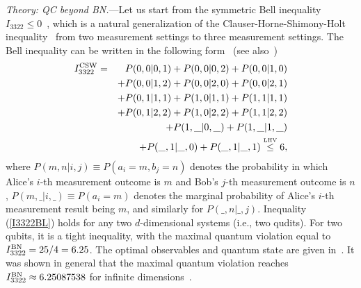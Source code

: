 \documentclass[prl,letterpaper,english,reprint,nofootinbib,aps,superscriptaddress,showpacs,showkeys]{revtex4-1}
\theoremstyle{definition}
\theoremstyle{remark}
\begin{document}

\emph{Theory: QC beyond BN.}---Let us start from the symmetric Bell inequality  $I_{3322}\le 0$~\cite{BG08}, which is a natural generalization of the Clauser-Horne-Shimony-Holt inequality~\cite{CHSH} from two measurement settings to three measurement settings.
The Bell inequality can be written in the following form~\cite{RDLTC14} (see also~\cite{SM})
 \begin{eqnarray}
 I_{3322}^{\rm CSW}
 &=&P(0,0 \vert 0,1) + P(0,0 \vert 0,2) + P(0,0 \vert 1,0) \nonumber\\
 &&+ P(0,0 \vert 1,2) + P(0,0 \vert 2,0) + P(0,0 \vert 2,1) \nonumber \\
 &&+ P(0,1 \vert 1,1) + P(1,0 \vert 1,1) + P(1,1 \vert 1,1) \nonumber\\
 &&+ P(0,1 \vert 2,2) + P(1,0 \vert 2,2) + P(1,1 \vert 2,2) \nonumber \\
 &&+ P(1,\_ \vert 0,\_) +P(1,\_ \vert 1,\_)\nonumber \\
 &&  + P(\_,1 \vert \_,0)+ P(\_,1 \vert \_,1)\stackrel{\mbox{\tiny{LHV}}}{\leq}6,
\label{I3322BL}
\end{eqnarray}
where $P(m,n|i,j)\equiv P(a_i=m, b_j=n)$ denotes the probability in which Alice's $i$-th measurement outcome is $m$ and Bob's $j$-th measurement outcome is $n$, $P(m,\_|i,\_)\equiv P(a_i=m)$ denotes the marginal probability of Alice's $i$-th measurement result being $m$, and similarly for $P(\_,n|\_,j)$. Inequality (\ref{I3322BL}) holds for any two $d$-dimensional systems (i.e., two qudits). For two qubits, it is a tight inequality, with the maximal quantum violation equal to $I_{3322}^{\rm BN}=25/4=6.25$. The optimal observables and quantum state are given in~\cite{SM}. It was shown in general that the maximal quantum violation reaches $I_{3322}^{\rm BN}\approx6.25087538$ for infinite dimensions~\cite{Pal10}.
\end{document}
